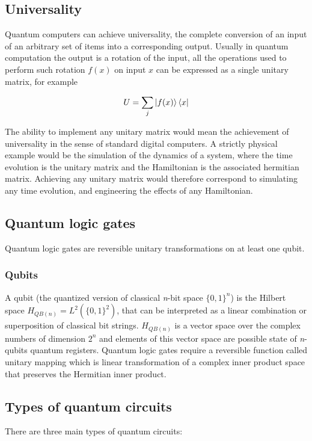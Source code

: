 	\subsection{Universality}
	Quantum computers can achieve universality, the complete conversion of an input of an arbitrary set of items into a corresponding output.
	Usually in quantum computation the output is a rotation of the input, all the operations used to perform such rotation $f(x)$ on input $x$ can be expressed as a single unitary matrix, for example

	$$U=\sum_j\ket{f(x)}\bra{x}$$

	The ability to implement any unitary matrix would mean the achievement of universality in the sense of standard digital computers.
	A strictly physical example would be the simulation of the dynamics of a system, where the time evolution is the unitary matrix and the Hamiltonian is the associated hermitian matrix.
	Achieving any unitary matrix would therefore correspond to simulating any time evolution, and engineering the effects of any Hamiltonian.

	\subsection{Quantum logic gates}
	Quantum logic gates are reversible unitary transformations on at least one qubit.

		\subsubsection{Qubits}
A qubit (the quantized version of classical \textit{n}-bit space $\{0,1\}^n$) is the Hilbert space $H_{QB(n)}=L^2(\{0,1\}^2)$, that can be interpreted as a linear combination or superposition of classical bit strings.
$H_{QB(n)}$ is a vector space over the complex numbers of dimension $2^n$ and elements of this vector space are possible state of \textit{n}-qubits quantum registers.
Quantum logic gates require a reversible function called unitary mapping which is linear transformation of a complex inner product space that preserves the Hermitian inner product.

	\subsection{Types of quantum circuits}
	There are three main types of quantum circuits:

